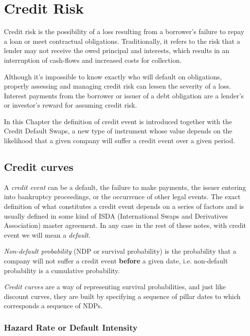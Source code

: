 \chapter{Credit Risk}\label{credit_default_swaps}

Credit risk is the possibility of a loss resulting from a borrower's failure to repay a loan or meet contractual obligations. Traditionally, it refers to the risk that a lender may not receive the owed principal and interests, which results in an interruption of cash-flows and increased costs for collection. 

Although it's impossible to know exactly who will default on obligations, properly assessing and managing credit risk can lessen the severity of a loss. Interest payments from the borrower or issuer of a debt obligation are a lender's or investor's reward for assuming credit risk.

In this Chapter the definition of credit event is introduced together with the Credit Default Swaps, a new type of instrument whose value depends on the likelihood that a given company will suffer a credit event over a given period.

\section{Credit curves}
\label{credit-curves}

A \emph{credit event} can be a default, the failure to make payments, the issuer entering into bankruptcy proceedings, or the occurrence of other legal events. The exact definition of what constitutes a credit event depends on a series of factors and is usually defined in some kind of ISDA (International Swaps and Derivatives Association) master agreement. In any case in the rest of these notes, with credit event we will mean a \emph{default}.

\emph{Non-default probability} (NDP or survival probability) is the probability that a company will not suffer a credit event \textbf{before} a given date, i.e. non-default probability is a cumulative probability.

\emph{Credit curves} are a way of representing survival probabilities, and just like discount curves, they are built by specifying a sequence of pillar dates to which corresponds a sequence of NDPs. 

\subsection{Hazard Rate or Default Intensity}
\label{hazard-rate}

